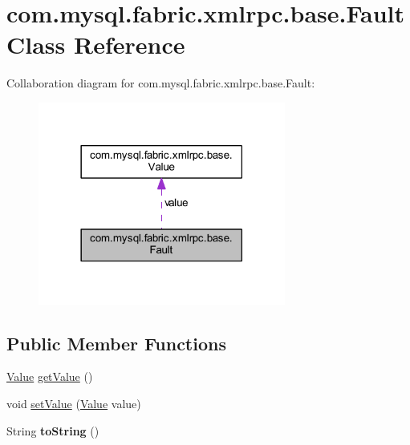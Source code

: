\hypertarget{classcom_1_1mysql_1_1fabric_1_1xmlrpc_1_1base_1_1_fault}{}\section{com.\+mysql.\+fabric.\+xmlrpc.\+base.\+Fault Class Reference}
\label{classcom_1_1mysql_1_1fabric_1_1xmlrpc_1_1base_1_1_fault}


Collaboration diagram for com.\+mysql.\+fabric.\+xmlrpc.\+base.\+Fault\+:\nopagebreak
\begin{figure}[H]
\begin{center}
\leavevmode
\includegraphics[width=230pt]{classcom_1_1mysql_1_1fabric_1_1xmlrpc_1_1base_1_1_fault__coll__graph}
\end{center}
\end{figure}
\subsection*{Public Member Functions}
\begin{DoxyCompactItemize}
\item 
\mbox{\hyperlink{classcom_1_1mysql_1_1fabric_1_1xmlrpc_1_1base_1_1_value}{Value}} \mbox{\hyperlink{classcom_1_1mysql_1_1fabric_1_1xmlrpc_1_1base_1_1_fault_ae0dd3fa0953c15b871929df9c1ad426e}{get\+Value}} ()
\item 
void \mbox{\hyperlink{classcom_1_1mysql_1_1fabric_1_1xmlrpc_1_1base_1_1_fault_a5155698ac5113e6d24e2b18874c5c7d4}{set\+Value}} (\mbox{\hyperlink{classcom_1_1mysql_1_1fabric_1_1xmlrpc_1_1base_1_1_value}{Value}} value)
\item 
\mbox{\label{classcom_1_1mysql_1_1fabric_1_1xmlrpc_1_1base_1_1_fault_ae1fe81309ec251223c217780b8c933c7}} 
String {\bfseries to\+String} ()
\end{DoxyCompactItemize}
